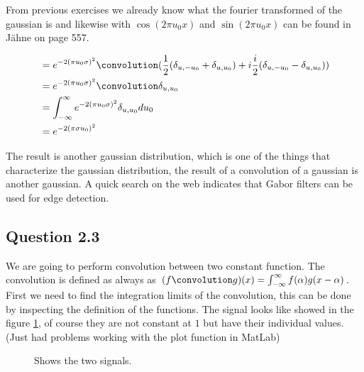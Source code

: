 \documentclass[a4paper, 10pt, final]{article}
\begin{document}
From previous exercises we already know what the fourier transformed of the gaussian is and likewise with $\cos{(2\pi u_{0}x)}$ and $\sin{(2\pi u_{0}x)}$ can be found in J\"ahne  on page 557.

\begin{align*}
  & = e^{-2(\pi u_{0}\sigma)^2} \convolution (\frac{1}{2}(\delta_{u,-u_{0}}+\delta_{u,u_{0}}) + i \frac{i}{2}(\delta_{u,-u_{0}} - \delta_{u,u_{0}})) \\
  & = e^{-2(\pi u_{0}\sigma)^2} \convolution \delta_{u,u_{0}} \\
  & = \int_{-\infty}^{\infty} e^{-2(\pi u_{0}\sigma)^2} \delta_{u,u_{0}} du_{0}\\
  & = e^{-2(\pi \sigma u_{0})^{2}}
\end{align*}

The result is another gaussian distribution, which is one of the
things that characterize the gaussian distribution, the result of a
convolution of a gaussian is another gaussian. A quick search on the
web indicates that Gabor filters can be used for edge detection.

\subsection*{Question 2.3}

We are going to perform convolution between two constant function. The
convolution is defined as always as $(f \convolution g)(x) =
\int_{-\infty}^{\infty} f(\alpha)g(x - \alpha)$. First we need to find
the integration limits of the convolution, this can be done by
inspecting the definition of the functions.
The signal looks like showed in the figure \ref{fig:q2_3a}, of course they are not constant at $1$ but have their individual values. (Just had problems working with the plot function in MatLab)

\begin{figure}[!ht]
  \centering
  \caption{Shows the two signals.}
    \label{fig:q2_3a}
\end{figure}
\end{document}
